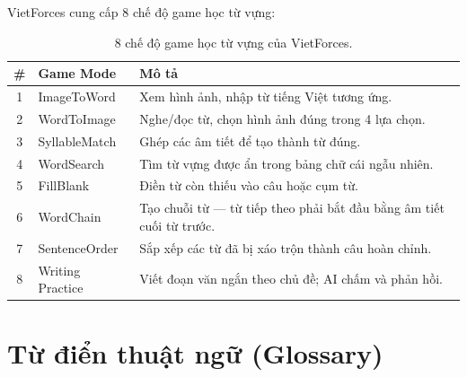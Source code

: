\documentclass[12pt,a4paper]{article}
\begin{document}
VietForces cung cấp 8 chế độ game học từ vựng:

\begin{table}[H]
\centering
\begin{tabular}{@{}clp{8cm}@{}}
\toprule
\textbf{\#} & \textbf{Game Mode} & \textbf{Mô tả} \\
\midrule
1 & ImageToWord & Xem hình ảnh, nhập từ tiếng Việt tương ứng. \\
2 & WordToImage & Nghe/đọc từ, chọn hình ảnh đúng trong 4 lựa chọn. \\
3 & SyllableMatch & Ghép các âm tiết để tạo thành từ đúng. \\
4 & WordSearch & Tìm từ vựng được ẩn trong bảng chữ cái ngẫu nhiên. \\
5 & FillBlank & Điền từ còn thiếu vào câu hoặc cụm từ. \\
6 & WordChain & Tạo chuỗi từ — từ tiếp theo phải bắt đầu bằng âm tiết cuối từ trước. \\
7 & SentenceOrder & Sắp xếp các từ đã bị xáo trộn thành câu hoàn chỉnh. \\
8 & Writing Practice & Viết đoạn văn ngắn theo chủ đề; AI chấm và phản hồi. \\
\bottomrule
\end{tabular}
\caption{8 chế độ game học từ vựng của VietForces.}
\end{table}

\section{Từ điển thuật ngữ (Glossary)}
\label{sec:glossary}
\end{document}
